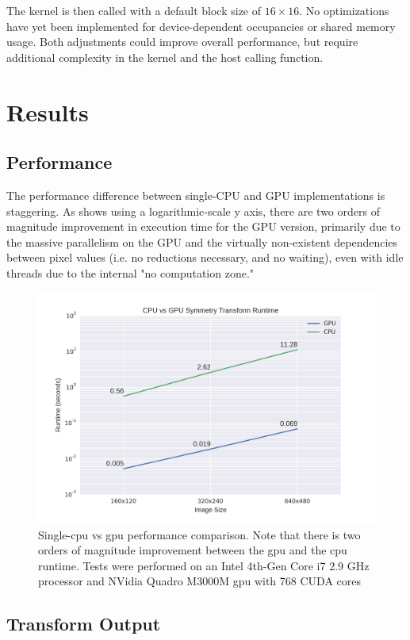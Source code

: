 The kernel is then called with a default block size of \(16\times16\). No optimizations have yet been implemented for device-dependent occupancies or shared memory usage. Both adjustments could improve overall performance, but require additional complexity in the kernel and the host calling function. 

\section{Results}
\label{sec:results}
\subsection{Performance}
\label{sec:performance}

The performance difference between single-CPU and GPU implementations is staggering. As  shows using a logarithmic-scale y axis, there are two orders of magnitude improvement in execution time for the GPU version, primarily due to the massive parallelism on the GPU and the virtually non-existent dependencies between pixel values (i.e. no reductions necessary, and no waiting), even with idle threads due to the internal "no computation zone." 

\begin{figure}[htbp]
\centering
\includegraphics[width=0.6\linewidth]{figures/cpu_v_gpu.png}
\caption{\label{fig:perf}
Single-\gls{cpu} vs \gls{gpu} performance comparison. Note that there is two orders of magnitude improvement between the \gls{gpu} and the \gls{cpu} runtime. Tests were performed on an Intel 4th-Gen Core i7 2.9 GHz processor and NVidia Quadro M3000M \gls{gpu} with 768 CUDA cores}
\end{figure}

\subsection{Transform Output}
\label{sec:transform-output}


